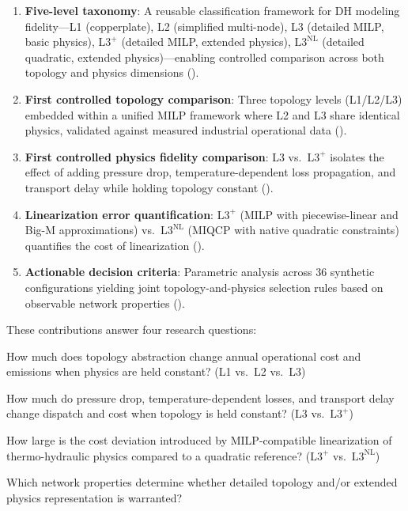 \documentclass[review,3p]{elsarticle}
\newcommand{\Lplus}{\mathrm{L3}^{+}}
\newcommand{\Lnl}{\mathrm{L3}^{\mathrm{NL}}}
\begin{document}
\begin{enumerate}
    \item \textbf{Five-level taxonomy}: A reusable classification
    framework for DH modeling fidelity---L1 (copperplate), L2
    (simplified multi-node), L3 (detailed MILP, basic physics),
    $\Lplus$ (detailed MILP, extended physics), $\Lnl$ (detailed
    quadratic, extended physics)---enabling controlled comparison
    across both topology and physics dimensions
    ().

    \item \textbf{First controlled topology comparison}: Three
    topology levels (L1/L2/L3) embedded within a unified MILP
    framework where L2 and L3 share identical physics, validated
    against measured industrial operational data ().

    \item \textbf{First controlled physics fidelity comparison}:
    L3 vs.\ $\Lplus$ isolates the effect of adding pressure drop,
    temperature-dependent loss propagation, and transport delay while
    holding topology constant ().

    \item \textbf{Linearization error quantification}: $\Lplus$
    (MILP with piecewise-linear and Big-M approximations) vs.\
    $\Lnl$ (MIQCP with native quadratic constraints) quantifies
    the cost of linearization ().

    \item \textbf{Actionable decision criteria}: Parametric analysis
    across 36 synthetic configurations yielding joint
    topology-and-physics selection rules based on observable network
    properties (\Cref{sec:results_generalizability}).
\end{enumerate}

These contributions answer four research questions:
\begin{description}[style=nextline,nosep]
    \item[RQ1 --- Topology Effect:]
    How much does topology abstraction change annual operational cost
    and \ce{CO2} emissions when physics are held constant?
    (L1 vs.\ L2 vs.\ L3)

    \item[RQ2 --- Physics Fidelity Effect:]
    How much do pressure drop, temperature-dependent losses, and
    transport delay change dispatch and cost when topology is held
    constant? (L3 vs.\ $\Lplus$)

    \item[RQ3 --- Linearization Error:]
    How large is the cost deviation introduced by MILP-compatible
    linearization of thermo-hydraulic physics compared to a
    quadratic reference? ($\Lplus$ vs.\ $\Lnl$)

    \item[RQ4 --- Generalizability:]
    Which network properties determine whether detailed topology
    and/or extended physics representation is warranted?
\end{description}
\end{document}
